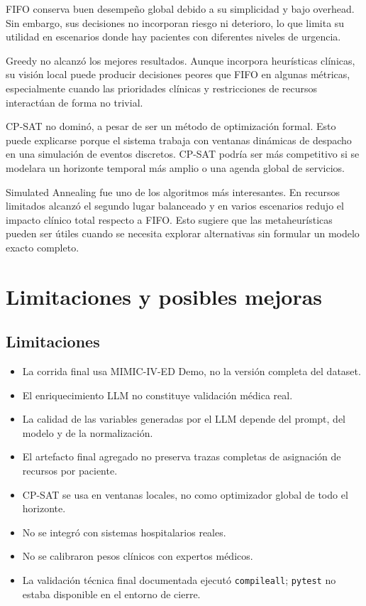 \documentclass[12pt,a4paper]{article}
\begin{document}
FIFO conserva buen desempeño global debido a su simplicidad y bajo overhead. Sin embargo, sus decisiones no incorporan riesgo ni deterioro, lo que limita su utilidad en escenarios donde hay pacientes con diferentes niveles de urgencia.

Greedy no alcanzó los mejores resultados. Aunque incorpora heurísticas clínicas, su visión local puede producir decisiones peores que FIFO en algunas métricas, especialmente cuando las prioridades clínicas y restricciones de recursos interactúan de forma no trivial.

CP-SAT no dominó, a pesar de ser un método de optimización formal. Esto puede explicarse porque el sistema trabaja con ventanas dinámicas de despacho en una simulación de eventos discretos. CP-SAT podría ser más competitivo si se modelara un horizonte temporal más amplio o una agenda global de servicios.

Simulated Annealing fue uno de los algoritmos más interesantes. En recursos limitados alcanzó el segundo lugar balanceado y en varios escenarios redujo el impacto clínico total respecto a FIFO. Esto sugiere que las metaheurísticas pueden ser útiles cuando se necesita explorar alternativas sin formular un modelo exacto completo.

\section{Limitaciones y posibles mejoras}

\subsection{Limitaciones}

\begin{itemize}
    \item La corrida final usa MIMIC-IV-ED Demo, no la versión completa del dataset.
    \item El enriquecimiento LLM no constituye validación médica real.
    \item La calidad de las variables generadas por el LLM depende del prompt, del modelo y de la normalización.
    \item El artefacto final agregado no preserva trazas completas de asignación de recursos por paciente.
    \item CP-SAT se usa en ventanas locales, no como optimizador global de todo el horizonte.
    \item No se integró con sistemas hospitalarios reales.
    \item No se calibraron pesos clínicos con expertos médicos.
    \item La validación técnica final documentada ejecutó \texttt{compileall}; \texttt{pytest} no estaba disponible en el entorno de cierre.
\end{itemize}
\end{document}
